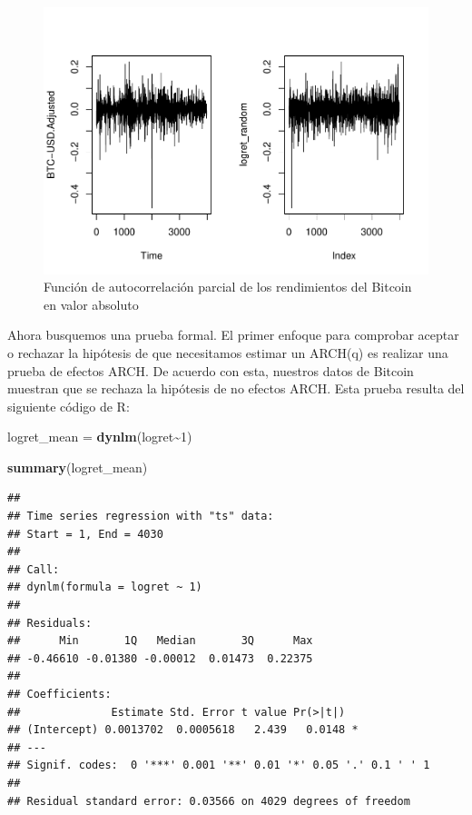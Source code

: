 \documentclass[
]{book}
\newenvironment{Shaded}{\begin{snugshade}}{\end{snugshade}}
\newcommand{\DecValTok}[1]{\textcolor[rgb]{0.00,0.00,0.81}{#1}}
\newcommand{\FunctionTok}[1]{\textcolor[rgb]{0.13,0.29,0.53}{\textbf{#1}}}
\newcommand{\NormalTok}[1]{#1}
\newcommand{\OtherTok}[1]{\textcolor[rgb]{0.56,0.35,0.01}{#1}}
\newcommand{\SpecialCharTok}[1]{\textcolor[rgb]{0.81,0.36,0.00}{\textbf{#1}}}
\begin{document}
\begin{figure}

{\centering \includegraphics{Notas-Series-Tiempo_files/figure-latex/fig109-1} 

}

\caption{Función de autocorrelación parcial de los rendimientos del Bitcoin en valor absoluto}\label{fig:fig109}
\end{figure}

Ahora busquemos una prueba formal. El primer enfoque para comprobar aceptar o rechazar la hipótesis de que necesitamos estimar un ARCH(q) es realizar una prueba de efectos ARCH. De acuerdo con esta, nuestros datos de Bitcoin muestran que se rechaza la hipótesis de no efectos ARCH. Esta prueba resulta del siguiente código de R:

\begin{Shaded}
\begin{Highlighting}[]
\NormalTok{logret\_mean }\OtherTok{=} \FunctionTok{dynlm}\NormalTok{(logret}\SpecialCharTok{\textasciitilde{}}\DecValTok{1}\NormalTok{)}

\FunctionTok{summary}\NormalTok{(logret\_mean)}
\end{Highlighting}
\end{Shaded}

\begin{verbatim}
## 
## Time series regression with "ts" data:
## Start = 1, End = 4030
## 
## Call:
## dynlm(formula = logret ~ 1)
## 
## Residuals:
##      Min       1Q   Median       3Q      Max 
## -0.46610 -0.01380 -0.00012  0.01473  0.22375 
## 
## Coefficients:
##              Estimate Std. Error t value Pr(>|t|)  
## (Intercept) 0.0013702  0.0005618   2.439   0.0148 *
## ---
## Signif. codes:  0 '***' 0.001 '**' 0.01 '*' 0.05 '.' 0.1 ' ' 1
## 
## Residual standard error: 0.03566 on 4029 degrees of freedom
\end{verbatim}
\end{document}
